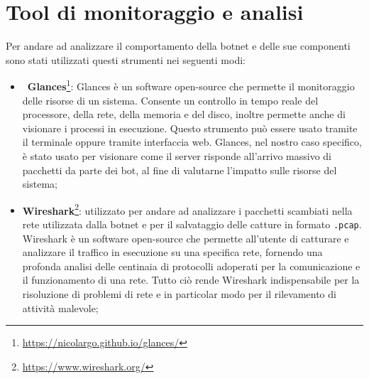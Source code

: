 \section{Tool di monitoraggio e analisi}\label{tool_monitoraggio}
Per andare ad analizzare il comportamento della botnet e delle sue componenti sono stati utilizzati questi strumenti nei seguenti modi:
\begin{itemize}
    \item\ \textbf{Glances}\footnote{\url{https://nicolargo.github.io/glances/}}: Glances è un software open-source che permette il monitoraggio delle risorse di un sistema. Consente un controllo in tempo reale del processore, della rete, della memoria e del disco, inoltre permette anche di visionare i processi in esecuzione. Questo strumento può essere usato tramite il terminale oppure tramite interfaccia web. Glances, nel nostro caso specifico, è stato usato per visionare come il server risponde all'arrivo massivo di pacchetti da parte dei bot, al fine di valutarne l'impatto sulle risorse del sistema;
    \item \textbf{Wireshark}\footnote{\url{https://www.wireshark.org/}}: utilizzato per andare ad analizzare i pacchetti scambiati nella rete utilizzata dalla botnet e per il salvataggio delle catture in formato \texttt{.pcap}. Wireshark è un software open-source che permette all'utente di catturare e analizzare il traffico in esecuzione su una specifica rete, fornendo una profonda analisi delle centinaia di protocolli adoperati per la comunicazione e il funzionamento di una rete. Tutto ciò rende Wireshark indispensabile per la risoluzione di problemi di rete e in particolar modo per il rilevamento di attività malevole;


\end{itemize}
